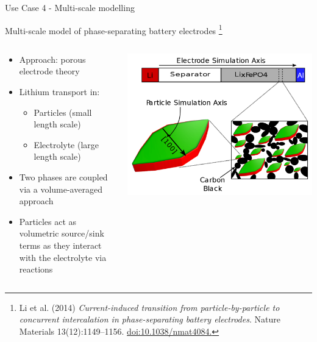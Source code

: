 \documentclass[compress,newPxFont,sthlmFooter]{beamer}
\begin{document}
\begin{frame}[plain]{Use Case 4 - Multi-scale modelling}
    \begin{center}
        \alert{Multi-scale model of phase-separating battery electrodes}
        \footnote{\tiny{Li et al. (2014) \textit{Current-induced transition
                    from particle-by-particle to concurrent intercalation in phase-separating battery electrodes}.
                    Nature Materials 13(12):1149–1156. \href{https://doi.org/10.1038/nmat4084}{doi:10.1038/nmat4084.}}
                }
    \end{center}  
    \begin{columns}[c]
      \begin{column}{0.6\textwidth}
        {\small
         \begin{itemize}
            \item Approach: \alert{porous electrode theory}
            \item Lithium transport in:
            \begin{itemize}
                \item Particles (small length scale)
                \item Electrolyte (large length scale)
            \end{itemize}
            \item Two phases are coupled via a volume-averaged approach
            \item Particles act as volumetric source/sink terms as they interact with the
                  electrolyte via reactions
        \end{itemize}
        }
      \end{column}
      
      \begin{column}{0.4\textwidth}
        \begin{center}
          \includegraphics[align=c, width=\textwidth]{multi_scale.png}
        \end{center}
      \end{column}
    \end{columns}
\end{frame}
\end{document}
